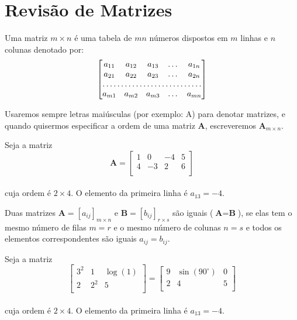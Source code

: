 \maketitle
\newpage
\section{Revisão de Matrizes}
\begin{df}
	Uma matriz $m\times n$ é uma tabela de $mn$ números dispostos em $m$ linhas e $n$ colunas denotado por:\\
	\[\begin{bmatrix}
		a_{11}       & a_{12} & a_{13} & \dots & a_{1n} \\
		a_{21}       & a_{22} & a_{23} & \dots & a_{2n} \\
		\hdotsfor{5} \\
		a_{m1}       & a_{m2} & a_{m3} & \dots & a_{mn}
	\end{bmatrix}\]	
\end{df}
Usaremos sempre letras maiúsculas (por exemplo: A) para denotar matrizes, e quando quisermos especificar a ordem de uma matriz $\textbf{A}$, escreveremos $\textbf{A}_{m\times n}$.

\begin{ex} Seja a matriz
	\[\textbf{A}=\begin{bmatrix}
	1       & 0 & -4 & 5 \\
	4       & -3 & 2 & 6 \\
	\end{bmatrix}\]\\
cuja ordem é $2\times 4$. O elemento da primeira linha é $a_{13}=-4$.
\end{ex}

\begin{df}
Duas matrizes $\textbf{A}=[a_{ij}]_{m\times n}$ e $\textbf{B}=[b_{ij}]_{r\times s}$ são iguais ($\textbf{A}=\textbf{B}$), se elas tem o mesmo número de filas $m=r$ e o mesmo número de colunas $n=s$ e todos os elementos correspondentes são iguais $a_{ij}=b_{ij}$.
	
\end{df}

\begin{ex} Seja a matriz
	\[\begin{bmatrix}
	3^{2}   & 1     & \log(1) \\
	2       & 2^{2} & 5 \\
	\end{bmatrix}=\begin{bmatrix}
	9      & \sin(90^{\circ}) & 0\\
	2      & 4        & 5\\
	\end{bmatrix}\] \\
	cuja ordem é $2\times 4$. O elemento da primeira linha é $a_{13}=-4$.
\end{ex}

